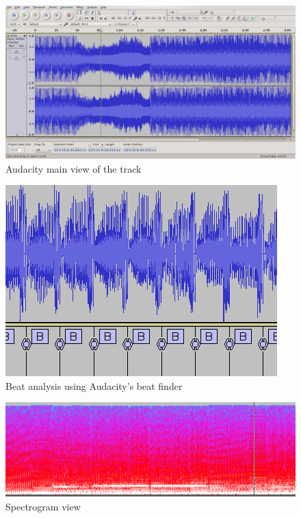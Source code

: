 \documentclass[a4paper, 12pt]{scrartcl}
\begin{document}
    \begin{figure}[H]
        \centering
        \includegraphics[scale=0.4]{audacity_main}
        \caption{Audacity main view of the track}
        \label{fig:main}
    \end{figure}

    \begin{figure}[H]
        \centering
        \includegraphics{audacity_beat}
        \caption{Beat analysis using Audacity's beat finder}
        \label{fig:beat}
    \end{figure}

    \begin{figure}[H]
        \centering
        \includegraphics{audacity_spectrum}
        \caption{Spectrogram view}
        \label{fig:spectrogram}
    \end{figure}
\end{document}
